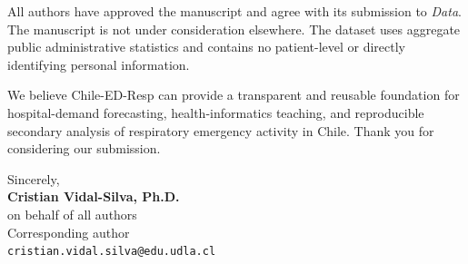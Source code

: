 \documentclass[10pt]{article}
\begin{document}
All authors have approved the manuscript and agree with its submission to \textit{Data}. The manuscript is not under consideration elsewhere. The dataset uses aggregate public administrative statistics and contains no patient-level or directly identifying personal information.

We believe Chile-ED-Resp can provide a transparent and reusable foundation for hospital-demand forecasting, health-informatics teaching, and reproducible secondary analysis of respiratory emergency activity in Chile. Thank you for considering our submission.

Sincerely,\\[10pt]
\textbf{Cristian Vidal-Silva, Ph.D.}\\
on behalf of all authors\\
Corresponding author\\
\texttt{cristian.vidal.silva@edu.udla.cl}
\end{document}
